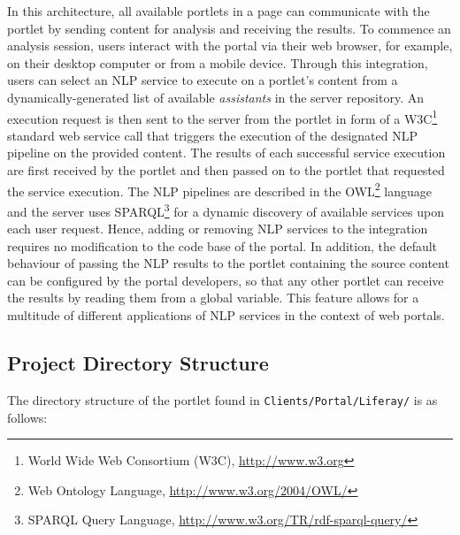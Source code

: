 In this architecture, all available portlets in a page can communicate with the \sa portlet by sending content for analysis and receiving the results. To commence an analysis session, users interact with the portal via their web browser, for example, on their desktop computer or from a mobile device. Through this integration, users can select an NLP service to execute on a portlet's content from a dynamically-generated list of available \emph{assistants} in the \sa server repository. An execution request is then sent to the \sa server from the \sa portlet in form of a W3C\footnote{World Wide Web Consortium (W3C), \url{http://www.w3.org}} standard web service call that triggers the execution of the designated NLP pipeline on the provided content. The results of each successful service execution are first received by the \sa portlet and then passed on to the portlet that requested the service execution. The NLP pipelines are described in the OWL\footnote{Web Ontology Language, \url{http://www.w3.org/2004/OWL/}} language and the \sa server uses SPARQL\footnote{SPARQL Query Language, \url{http://www.w3.org/TR/rdf-sparql-query/}} for a dynamic discovery of available services upon each user request. Hence, adding or removing NLP services to the integration requires no modification to the code base of the portal. In addition, the default behaviour of passing the NLP results to the portlet containing the source content can be configured by the portal developers, so that any other portlet can receive the results by reading them from a global variable. This feature allows for a multitude of different applications of NLP services in the context of web portals.

\subsection{Project Directory Structure}
The directory structure of the \sa portlet found in \texttt{Clients/Portal/Liferay/} is as follows:


